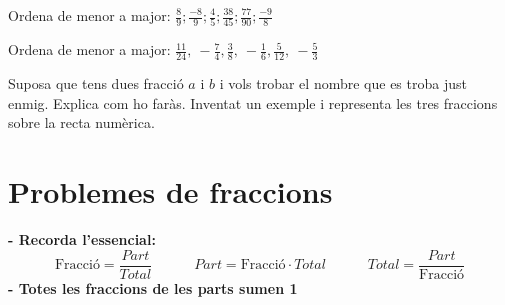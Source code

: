 \begin{mylist}


	\exer  Ordena de menor a major: $\frac{8}{9} ;\frac{-8}{9} ;\frac{4}{5} ;\frac{38}{45} ;\frac{77}{90} ;\frac{-9}{8} $


 
	\exer  Ordena de menor a major: $\frac{11}{24},\ -\frac{7}{4},\frac{3}{8},\ -\frac{1}{6},\frac{5}{12},\ -\frac{5}{3}$
 



 
	\exer  Suposa que tens dues fracció $a$ i $b$ i vols trobar el nombre que es troba just enmig. Explica com ho faràs. Inventat un exemple i representa les tres fraccions sobre la recta numèrica.
	
	\redacta
\end{mylist}
 
\section{Problemes de fraccions}
\begin{theorybox} 
\begin{minipage}{0.5\textwidth}
	\centering
\end{minipage}
\begin{minipage}{0.5\textwidth}
	\centering
\end{minipage}


\textbf{- Recorda l'essencial:}
\[\text{Fracció} = \frac{Part}{Total} \quad\quad\quad Part=\text{Fracció} \cdot Total   \quad\quad\quad  Total = \frac{Part}{\text{Fracció}}\]
\textbf{- Totes les fraccions de les parts sumen 1}

\end{theorybox}

